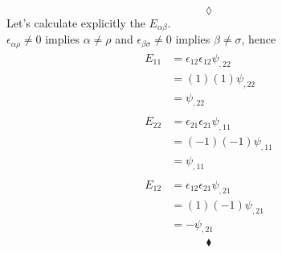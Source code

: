 $$\lozenge$$
Let's calculate explicitly the $E_{\alpha\beta}$.\\
$\epsilon_{\alpha\rho}\ne0$ implies $\alpha\ne\rho$ and $\epsilon_{\beta \sigma}\ne0$ implies $\beta \ne\sigma$, hence
\begin{align}
\begin{array}{ll}
E_{11}&=\epsilon_{12}\epsilon_{12}\psi_{,22}\\
&=(1)(1)\psi_{,22}\\
&=\psi_{,22}\\\\
E_{22}&=\epsilon_{21}\epsilon_{21}\psi_{,11}\\
&=(-1)(-1)\psi_{,11}\\
&=\psi_{,11}\\\\
E_{12}&=\epsilon_{12}\epsilon_{21}\psi_{,21}\\
&=(1)(-1)\psi_{,21}\\
&=-\psi_{,21}
\end{array}
\end{align}
$$\blacklozenge$$
\newpage


